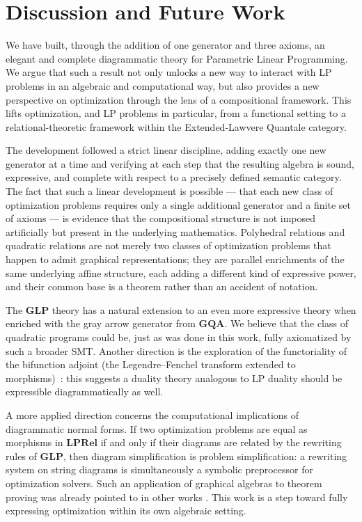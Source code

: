 \section{Discussion and Future Work}

We have built, through the addition of one generator and three axioms,
an elegant and complete diagrammatic theory for Parametric Linear Programming.
We argue that such a result not only unlocks a new way to interact with LP problems in an algebraic
and computational way, but also provides a new perspective on optimization through the lens of
a compositional framework. This lifts optimization, and LP problems in particular, from a functional setting to a relational-theoretic framework within the Extended-Lawvere Quantale category.

The development followed a strict linear discipline, adding exactly one new
generator at a time and verifying at each step that the resulting algebra is
sound, expressive, and complete with respect to a precisely defined semantic
category. The fact that such a linear development is
possible --- that each new class of optimization problems requires only a single
additional generator and a finite set of axioms --- is evidence that the
compositional structure is not imposed artificially but present in the
underlying mathematics. Polyhedral relations and quadratic relations are not merely two
classes of optimization problems that happen to admit graphical representations;
they are parallel enrichments of the same underlying affine structure, each adding
a different kind of expressive power, and their common base is a theorem rather than
an accident of notation.

The $\mathbf{GLP}$ theory has a natural extension to an even more expressive theory
when enriched with the gray arrow generator from $\mathbf{GQA}$. We believe that the class
of quadratic programs could be, just as was done in this work, fully axiomatized by such a
broader SMT. Another direction is the exploration of the functoriality of the bifunction
adjoint (the Legendre--Fenchel transform extended to morphisms)~\cite{willerton2015legendre, touchette2005legendre}: this suggests a duality theory
analogous to LP duality should be expressible diagrammatically as well.

A more applied direction concerns the computational implications of diagrammatic
normal forms. If two optimization problems are equal as morphisms in
$\mathbf{LPRel}$ if and only if their diagrams are related by the rewriting rules
of $\mathbf{GLP}$, then diagram simplification is problem simplification: a
rewriting system on string diagrams is simultaneously a symbolic preprocessor
for optimization solvers. Such an application of graphical algebras to theorem
proving was already pointed to in other works \cite{bonchi2021.9farkas,bonchi2021polyhedral}.
This work is a step toward fully expressing optimization within
its own algebraic setting.

